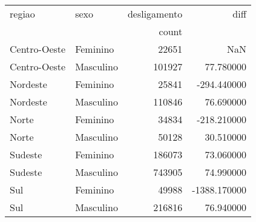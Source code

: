 \begin{tabular}{llrr}
\toprule
regiao & sexo & desligamento & diff \\
 &  & count &  \\
\midrule
Centro-Oeste & Feminino & 22651 & NaN \\
Centro-Oeste & Masculino & 101927 & 77.780000 \\
Nordeste & Feminino & 25841 & -294.440000 \\
Nordeste & Masculino & 110846 & 76.690000 \\
Norte & Feminino & 34834 & -218.210000 \\
Norte & Masculino & 50128 & 30.510000 \\
Sudeste & Feminino & 186073 & 73.060000 \\
Sudeste & Masculino & 743905 & 74.990000 \\
Sul & Feminino & 49988 & -1388.170000 \\
Sul & Masculino & 216816 & 76.940000 \\
\bottomrule
\end{tabular}
